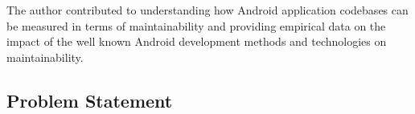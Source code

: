 The author contributed to understanding how Android application codebases can be measured in terms of maintainability and providing empirical data on the impact of the well known Android development methods and technologies on maintainability. 

\subsection{Problem Statement}
\label{section:1.1}
